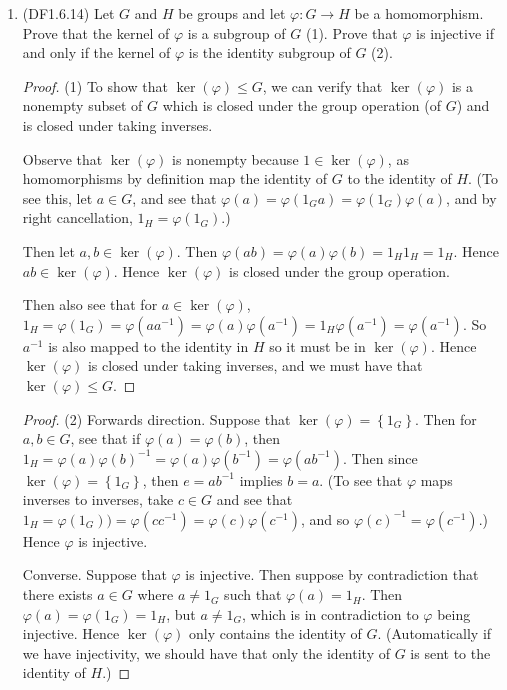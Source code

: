 \documentclass[11pt]{article}
\newcommand{\cbr}[1]{\left\{#1\right\}}
\begin{document}
\begin{enumerate}
    \item (DF1.6.14) Let $G$ and $H$ be groups and let $\varphi\colon G\to H$ be a homomorphism. Prove that the kernel of $\varphi$ is a subgroup of $G$ (1). Prove that $\varphi$ is injective if and only if the kernel of $\varphi$ is the identity subgroup of $G$ (2). \begin{proof}
      (1) To show that $\ker(\varphi)\leq G$, we can verify that $\ker(\varphi)$ is a nonempty subset of $G$ which is closed under the group operation (of $G$) and is closed under taking inverses.

      Observe that $\ker(\varphi)$ is nonempty because $1\in\ker(\varphi)$, as homomorphisms by definition map the identity of $G$ to the identity of $H$. (To see this, let $a\in G$, and see that $\varphi(a) = \varphi(1_Ga) = \varphi(1_G)\varphi(a)$, and by right cancellation, $1_H = \varphi(1_G)$.)

      Then let $a,b\in\ker(\varphi)$. Then $\varphi(ab) = \varphi(a)\varphi(b) = 1_H1_H = 1_H$. Hence $ab\in\ker(\varphi)$. Hence $\ker(\varphi)$ is closed under the group operation.

      Then also see that for $a\in\ker(\varphi)$, $1_H = \varphi(1_G) = \varphi(aa^{-1}) = \varphi(a)\varphi(a^{-1}) = 1_H\varphi(a^{-1}) = \varphi(a^{-1})$. So $a^{-1}$ is also mapped to the identity in $H$ so it must be in $\ker(\varphi)$. Hence $\ker(\varphi)$ is closed under taking inverses, and we must have that $\ker(\varphi)\leq G$.
    \end{proof} \begin{proof}
      (2) Forwards direction. Suppose that $\ker(\varphi) = \cbr{1_G}$. Then for $a,b\in G$, see that if $\varphi(a) = \varphi(b)$, then $1_H = \varphi(a)\varphi(b)^{-1} = \varphi(a)\varphi(b^{-1}) = \varphi(ab^{-1})$. Then since $\ker(\varphi) = \cbr{1_G}$, then $e = ab^{-1}$ implies $b = a$. (To see that $\varphi$ maps inverses to inverses, take $c\in G$ and see that $1_H = \varphi(1_G)) = \varphi(cc^{-1}) = \varphi(c)\varphi(c^{-1})$, and so $\varphi(c)^{-1} = \varphi(c^{-1})$.) Hence $\varphi$ is injective.

      Converse. Suppose that $\varphi$ is injective. Then suppose by contradiction that there exists $a\in G$ where $a \neq 1_G$ such that $\varphi(a) = 1_H$. Then $\varphi(a) = \varphi(1_G) = 1_H$, but $a \neq 1_G$, which is in contradiction to $\varphi$ being injective. Hence $\ker(\varphi)$ only contains the identity of $G$. (Automatically if we have injectivity, we should have that only the identity of $G$ is sent to the identity of $H$.)
    \end{proof}
    

\end{enumerate}
\end{document}
